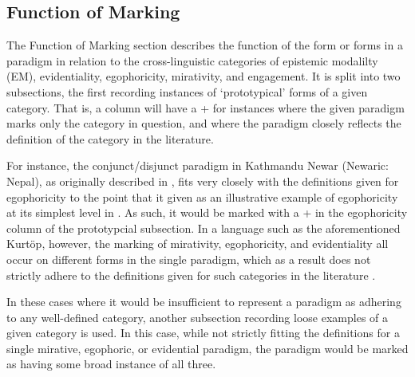 \subsection{Function of Marking}
The Function of Marking section describes the function of the form or forms in a paradigm in relation to the cross-linguistic categories of epistemic modalilty (EM), evidentiality, egophoricity, mirativity, and engagement. It is split into two subsections, the first recording instances of `prototypical' forms of a given category. That is, a column will have a + for instances where the given paradigm marks only the category in question, and where the paradigm closely reflects the definition of the category in the literature.

For instance, the conjunct/disjunct paradigm in Kathmandu Newar (Newaric: Nepal), as originally described in , fits very closely with the definitions given for egophoricity to the point that it given as an illustrative example of egophoricity at its simplest level in . As such, it would be marked with a + in the egophoricity column of the prototypcial subsection. In a language such as the aforementioned Kurtöp, however, the marking of mirativity, egophoricity, and evidentiality all occur on different forms in the single paradigm, which as a result does not strictly adhere to the definitions given for such categories in the literature \cites{DeLancey2012}{EgoIntro}{Aikhenvald2018Intro}.

In these cases where it would be insufficient to represent a paradigm as adhering to any well-defined category, another subsection recording loose examples of a given category is used. In this case, while not strictly fitting the definitions for a single mirative, egophoric, or evidential paradigm, the paradigm would be marked as having some broad instance of all three.

